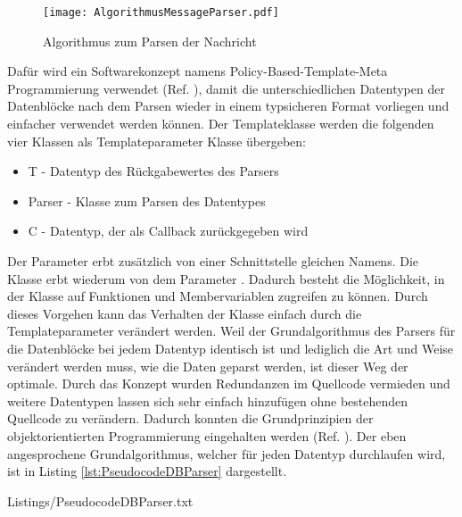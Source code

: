 \begin{figure}[H]
\centering
\texttt{[image: AlgorithmusMessageParser.pdf]}
\caption{Algorithmus zum Parsen der Nachricht}
\label{fig:AlgorithmusMessageParser}
\end{figure}

Daf{\"u}r wird ein Softwarekonzept namens Policy-Based-Template-Meta Programmierung
verwendet (Ref. \cite{Alexandrescu:2001:MCD:377789}), damit die
unterschiedlichen Datentypen der Datenbl{\"o}cke nach dem Parsen wieder in einem
typsicheren Format vorliegen und einfacher verwendet werden k{\"o}nnen.
Der Templateklasse werden die folgenden vier Klassen als Templateparameter
Klasse {\"u}bergeben:

\begin{itemize}
\item T - Datentyp des R{\"u}ckgabewertes des Parsers
\item Parser - Klasse zum Parsen des Datentypes
\item C - Datentyp, der als Callback zur{\"u}ckgegeben wird
\end{itemize}

Der Parameter  erbt zus{\"a}tzlich von einer
Schnittstelle gleichen Namens. Die Klasse  erbt
wiederum von dem Parameter .
Dadurch besteht die M{\"o}glichkeit, in der Klasse auf Funktionen und
Membervariablen zugreifen zu k{\"o}nnen.
Durch dieses Vorgehen kann das Verhalten der Klasse einfach durch die
Templateparameter ver{\"a}ndert werden. Weil der Grundalgorithmus des Parsers
f{\"u}r die Datenbl{\"o}cke bei jedem Datentyp identisch ist und lediglich die
Art und Weise ver{\"a}ndert werden muss, wie die Daten geparst werden,
ist dieser Weg der optimale. Durch das Konzept wurden
Redundanzen im Quellcode vermieden und weitere Datentypen lassen sich
sehr einfach hinzuf{\"u}gen ohne bestehenden Quellcode zu ver{\"a}ndern. Dadurch konnten
die Grundprinzipien der objektorientierten Programmierung eingehalten werden (Ref. \cite{herold2001go}).
Der eben angesprochene Grundalgorithmus, welcher f{\"u}r jeden Datentyp
durchlaufen wird, ist in Listing \ref{lst:PseudocodeDBParser} dargestellt.

\lstset{language=pseudo}
\lstset{commentstyle=\textit}
{Listings/PseudocodeDBParser.txt}
